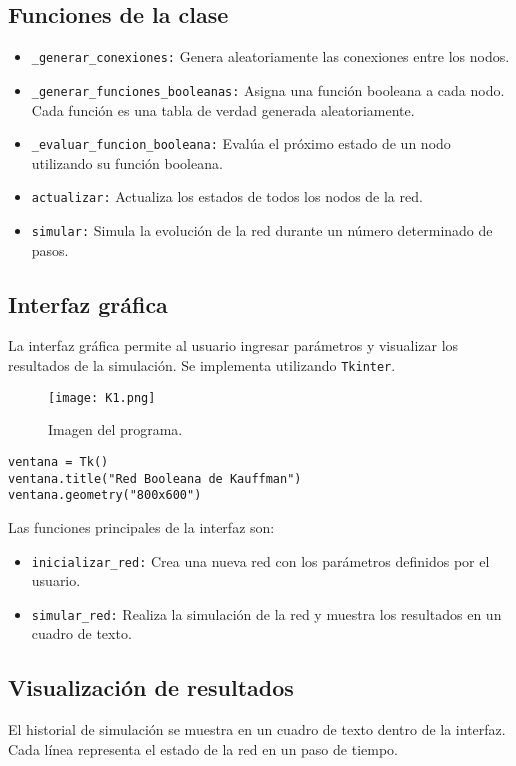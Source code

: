 \documentclass[12pt]{article}
\begin{document}
\subsection{Funciones de la clase}
\begin{itemize}
    \item \texttt{\_generar\_conexiones:} Genera aleatoriamente las conexiones entre los nodos.
    \item \texttt{\_generar\_funciones\_booleanas:} Asigna una función booleana a cada nodo. Cada función es una tabla de verdad generada aleatoriamente.
    \item \texttt{\_evaluar\_funcion\_booleana:} Evalúa el próximo estado de un nodo utilizando su función booleana.
    \item \texttt{actualizar:} Actualiza los estados de todos los nodos de la red.
    \item \texttt{simular:} Simula la evolución de la red durante un número determinado de pasos.
\end{itemize}

\subsection{Interfaz gráfica}
La interfaz gráfica permite al usuario ingresar parámetros y visualizar los resultados de la simulación. Se implementa utilizando \texttt{Tkinter}.
\begin{figure}[h]
    \centering
    \texttt{[image: K1.png]}
    \caption{Imagen del programa.}
    \label{fig:original}
\end{figure}

\begin{lstlisting}
ventana = Tk()
ventana.title("Red Booleana de Kauffman")
ventana.geometry("800x600")
\end{lstlisting}

\noindent Las funciones principales de la interfaz son:
\begin{itemize}
    \item \texttt{inicializar\_red:} Crea una nueva red con los parámetros definidos por el usuario.
    \item \texttt{simular\_red:} Realiza la simulación de la red y muestra los resultados en un cuadro de texto.
\end{itemize}
        
\subsection{Visualización de resultados}
El historial de simulación se muestra en un cuadro de texto dentro de la interfaz. Cada línea representa el estado de la red en un paso de tiempo.
\end{document}
